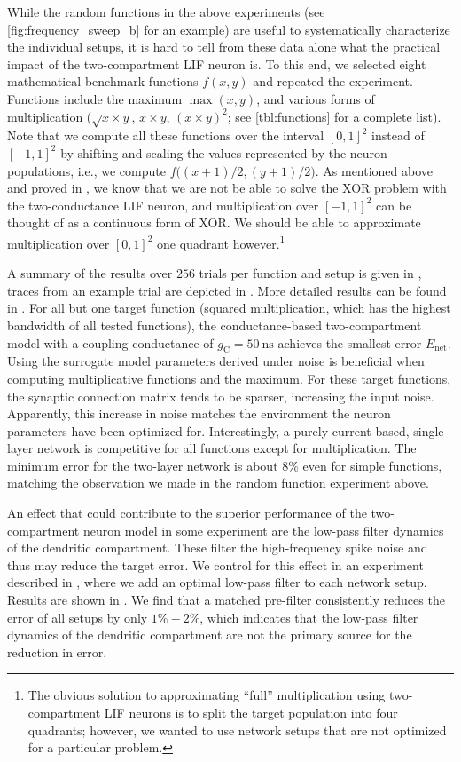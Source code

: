 While the random functions in the above experiments (see \cref{fig:frequency_sweep_b} for an example) are useful to systematically characterize the individual setups, it is hard to tell from these data alone what the practical impact of the two-compartment LIF neuron is. To this end, we selected eight mathematical benchmark functions $f(x, y)$ and repeated the experiment. Functions include the maximum $\max(x, y)$, and various forms of multiplication ($\sqrt{x \times y}$, $x \times y$, $(x \times y)^2$; see \cref{tbl:functions} for a complete list). Note that we compute all these functions over the interval $[0, 1]^2$ instead of $[-1, 1]^2$ by shifting and scaling the values represented by the neuron populations, i.e., we compute $f\big((x+1)/2, (y + 1)/2\big)$. As mentioned above and proved in , we know that we are not be able to solve the XOR problem with the two-conductance LIF neuron, and multiplication over $[-1, 1]^2$ can be thought of as a continuous form of XOR. We should be able to approximate multiplication over $[0, 1]^2$ one quadrant however.\footnote{The obvious solution to approximating \enquote{full} multiplication using two-compartment LIF neurons is to split the target population into four quadrants; however, we wanted to use network setups that are not optimized for a particular problem.}

A summary of the results over $256$ trials per function and setup is given in , traces from an example trial are depicted in . More detailed results can be found in . For all but one target function (squared multiplication, which has the highest bandwidth of all tested functions), the conductance-based two-compartment model with a coupling conductance of $g_\mathrm{C} = \SI{50}{\nano\second}$ achieves the smallest error $E_\mathrm{net}$. Using the surrogate model parameters derived under noise is beneficial when computing multiplicative functions and the maximum. For these target functions, the synaptic connection matrix tends to be sparser, increasing the input noise. Apparently, this increase in noise matches the environment the neuron parameters have been optimized for. Interestingly, a purely current-based, single-layer network is competitive for all functions except for multiplication. The minimum error for the two-layer network is about $8\%$ even for simple functions, matching the observation we made in the random function experiment above.

An effect that could contribute to the superior performance of the two-compartment neuron model in some experiment are the low-pass filter dynamics of the dendritic compartment. These filter the high-frequency spike noise and thus may reduce the target error. We control for this effect in an experiment described in , where we add an optimal low-pass filter to each network setup. Results are shown in . We find that a matched pre-filter consistently reduces the error of all setups by only $1\%-2\%$, which indicates that the low-pass filter dynamics of the dendritic compartment are not the primary source for the reduction in error.

